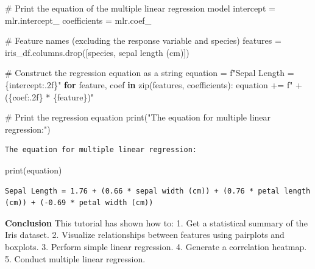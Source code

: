 \documentclass[
  letterpaper,
  DIV=11,
  numbers=noendperiod]{scrreprt}
\newenvironment{Shaded}{\begin{snugshade}}{\end{snugshade}}
\newcommand{\BuiltInTok}[1]{\textcolor[rgb]{0.00,0.23,0.31}{#1}}
\newcommand{\CommentTok}[1]{\textcolor[rgb]{0.37,0.37,0.37}{#1}}
\newcommand{\ControlFlowTok}[1]{\textcolor[rgb]{0.00,0.23,0.31}{\textbf{#1}}}
\newcommand{\KeywordTok}[1]{\textcolor[rgb]{0.00,0.23,0.31}{\textbf{#1}}}
\newcommand{\NormalTok}[1]{\textcolor[rgb]{0.00,0.23,0.31}{#1}}
\newcommand{\OperatorTok}[1]{\textcolor[rgb]{0.37,0.37,0.37}{#1}}
\newcommand{\SpecialCharTok}[1]{\textcolor[rgb]{0.37,0.37,0.37}{#1}}
\newcommand{\SpecialStringTok}[1]{\textcolor[rgb]{0.13,0.47,0.30}{#1}}
\newcommand{\StringTok}[1]{\textcolor[rgb]{0.13,0.47,0.30}{#1}}
\begin{document}
\begin{Shaded}
\begin{Highlighting}[]
\CommentTok{\# Print the equation of the multiple linear regression model}
\NormalTok{intercept }\OperatorTok{=}\NormalTok{ mlr.intercept\_}
\NormalTok{coefficients }\OperatorTok{=}\NormalTok{ mlr.coef\_}

\CommentTok{\# Feature names (excluding the response variable and species)}
\NormalTok{features }\OperatorTok{=}\NormalTok{ iris\_df.columns.drop([}\StringTok{\textquotesingle{}species\textquotesingle{}}\NormalTok{, }\StringTok{\textquotesingle{}sepal length (cm)\textquotesingle{}}\NormalTok{])}

\CommentTok{\# Construct the regression equation as a string}
\NormalTok{equation }\OperatorTok{=} \SpecialStringTok{f"Sepal Length = }\SpecialCharTok{\{}\NormalTok{intercept}\SpecialCharTok{:.2f\}}\SpecialStringTok{"}
\ControlFlowTok{for}\NormalTok{ feature, coef }\KeywordTok{in} \BuiltInTok{zip}\NormalTok{(features, coefficients):}
\NormalTok{    equation }\OperatorTok{+=} \SpecialStringTok{f" + (}\SpecialCharTok{\{}\NormalTok{coef}\SpecialCharTok{:.2f\}}\SpecialStringTok{ * }\SpecialCharTok{\{}\NormalTok{feature}\SpecialCharTok{\}}\SpecialStringTok{)"}

\CommentTok{\# Print the regression equation}
\BuiltInTok{print}\NormalTok{(}\StringTok{"The equation for multiple linear regression:"}\NormalTok{)}
\end{Highlighting}
\end{Shaded}

\begin{verbatim}
The equation for multiple linear regression:
\end{verbatim}

\begin{Shaded}
\begin{Highlighting}[]
\BuiltInTok{print}\NormalTok{(equation)}
\end{Highlighting}
\end{Shaded}

\begin{verbatim}
Sepal Length = 1.76 + (0.66 * sepal width (cm)) + (0.76 * petal length (cm)) + (-0.69 * petal width (cm))
\end{verbatim}

\textbf{Conclusion} This tutorial has shown how to: 1. Get a statistical
summary of the Iris dataset. 2. Visualize relationships between features
using pairplots and boxplots. 3. Perform simple linear regression. 4.
Generate a correlation heatmap. 5. Conduct multiple linear regression.
\end{document}
